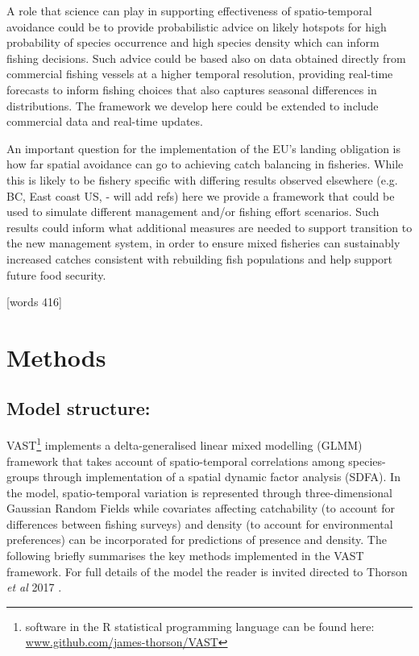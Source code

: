 \documentclass{nature}
\begin{document}
\begin{linenumbers}
A role that science can play in supporting effectiveness of spatio-temporal
avoidance could be to provide probabilistic advice on likely hotspots for high
probability of species occurrence and high species density which can inform
fishing decisions. Such advice could be based also on data obtained directly
from commercial fishing vessels at a higher temporal resolution, providing real-time forecasts to inform fishing choices that also captures seasonal
differences in distributions. The framework we develop here could be extended to include commercial data and real-time updates.

An important question for the implementation of the EU's landing obligation is
how far spatial avoidance can go to achieving catch balancing in fisheries.
While this is likely to be fishery specific with differing results observed
elsewhere (e.g. BC, East coast US, - will add refs) here we provide a framework
that could be used to simulate different management and/or fishing effort
scenarios. Such results could inform what additional measures are needed to
support transition to the new management system, in order to ensure mixed
fisheries can sustainably increased catches consistent with rebuilding fish
populations and help support future food security.

[words 416]

\section*{Methods}

\subsection{Model structure:} 

VAST\footnote{software in the R statistical programming language can be found
	here: \url{www.github.com/james-thorson/VAST}} implements a
delta-generalised linear mixed modelling (GLMM) framework that takes account of
spatio-temporal correlations among species-groups through implementation of a
spatial dynamic factor analysis (SDFA).  In the model, spatio-temporal
variation is represented through three-dimensional Gaussian Random Fields while
covariates affecting catchability (to account for differences between fishing
surveys) and density (to account for environmental preferences) can be
incorporated for predictions of presence and density. The following briefly
summarises the key methods implemented in the VAST framework. For full details
of the model the reader is invited directed to Thorson \textit{et al} 2017
\cite{Thorson2017}.


\end{linenumbers}
\end{document}
